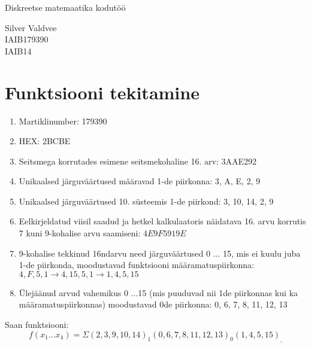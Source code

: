 \documentclass{article}
\begin{document}
\begin{titlepage}
\centering
\vspace*{\fill}
\Huge{Diskreetse matemaatika kodutöö}
\begin{flushright}
\large{
Silver Valdvee\\
IAIB179390\\
IAIB14}
\end{flushright}
\vspace*{\fill}
\thispagestyle{firstpage}
\end{titlepage}


\section{Funktsiooni tekitamine}
\begin{enumerate}
    \item Martiklinumber: 179390
    \item HEX: 2BCBE
    \item Seitsmega korrutades esimene seitsmekohaline 16. arv: 3AAE292
    \item Unikaalsed järguväärtused määravad 1-de piirkonna: 3, A, E, 2, 9
    \item Unikaalsed järguväärtused 10. süsteemis 1-de piirkond: 3, 10, 14, 2, 9
    \item Eelkirjeldatud viisil saadud ja hetkel kalkulaatoris näidatava 16. arvu korrutis 7 kuni 9-kohalise arvu saamiseni: $4E9F5919E$
    \item 9-kohalise tekkinud 16ndarvu need järguväärtused 0 ... 15, mis ei kuulu juba 1-de piirkonda, moodustavad funktsiooni määramatuspiirkonna: $4, F, 5, 1 \rightarrow 4, 15, 5, 1 \rightarrow 1, 4, 5, 15$
    \item Ülejäänud arvud vahemikus 0 ...15 (mis puuduvad nii 1de piirkonnas kui ka määramatuspiirkonnas) moodustavad 0de piirkonna: 0, 6, 7, 8, 11, 12, 13
\end{enumerate}
Saan funktsiooni:
\[f(x_1...x_4)=\Sigma(2,3,9,10,14)_1(0,6,7,8,11,12,13)_0(1,4,5,15)_{\_}
\]
\end{document}
